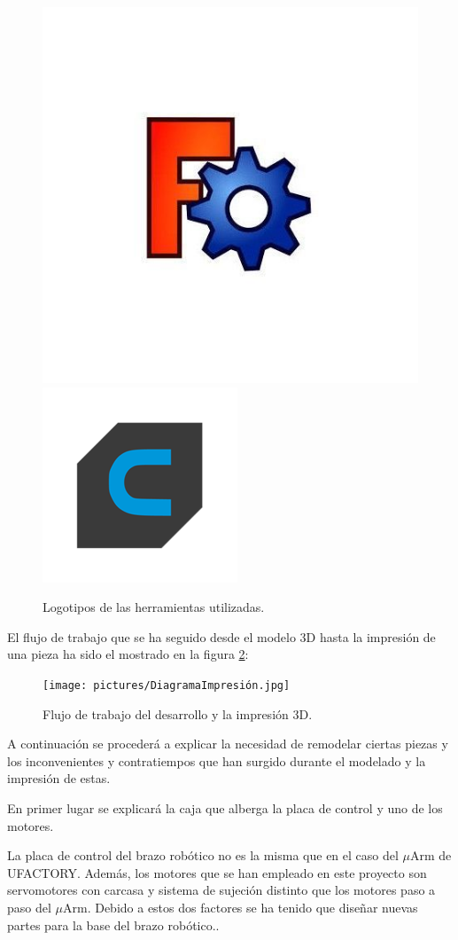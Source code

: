 \begin{figure}[H]
    \centering
    \includegraphics[width=.45\linewidth]{pictures/freeCAD.jpg}
    \hspace{1cm}
    \includegraphics[width=.40\linewidth]{pictures/Ultimaker_cura_logo.png}
    \caption{Logotipos de las herramientas utilizadas.}
    \label{fig:herramientas_3d}
\end{figure}

El flujo de trabajo que se ha seguido desde el modelo 3D hasta la impresión de una pieza ha sido el mostrado en la figura \ref{fig:flujo_3d}:

\begin{figure}[H]
    \centering
    \texttt{[image: pictures/DiagramaImpresión.jpg]}
    \caption{Flujo de trabajo del desarrollo y la impresión 3D.}
    \label{fig:flujo_3d}
\end{figure}

A continuación se procederá a explicar la necesidad de remodelar ciertas piezas y los inconvenientes y contratiempos que han surgido durante el modelado y la impresión de estas.

En primer lugar se explicará la caja que alberga la placa de control y uno de los motores.

La placa de control del brazo robótico no es la misma que en el caso del $\mu$Arm de UFACTORY. Además, los motores que se han empleado en este proyecto son servomotores con carcasa y sistema de sujeción distinto que los motores paso a paso del $\mu$Arm. Debido a estos dos factores se ha tenido que diseñar nuevas partes para la base del brazo robótico..

